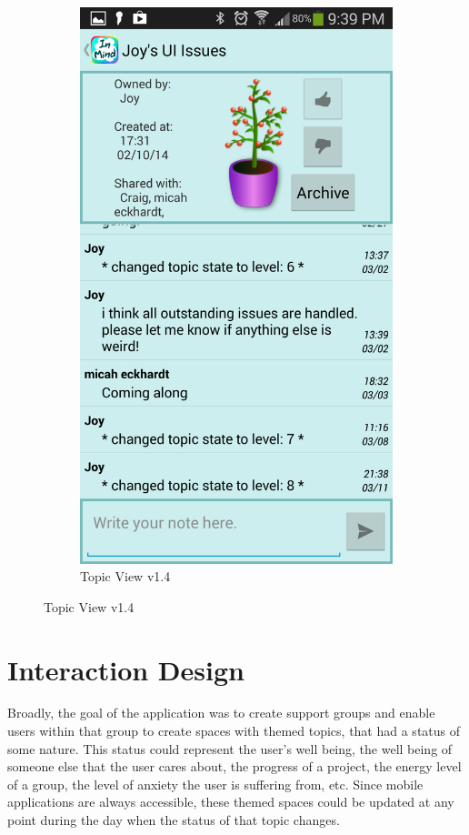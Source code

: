 \begin{figure}
\begin{subfigure}[b]{0.4\textwidth}
      \includegraphics[width=\textwidth]{plant_final.png}
       \caption{Topic View v1.4}
    \end{subfigure}
    \label{fig:topic_screens}
  \end{figure}

  \section{Interaction Design}
  Broadly, the goal of the application was to create support groups and 
  enable users within that group to create spaces
  with themed topics, that had a status of some nature.
  This status could represent the user's well being, the well being of someone else
  that the user cares about, the progress of a project, the energy level of a group,
  the level of anxiety the user is suffering from, etc.
  Since mobile applications are always accessible,
  these themed spaces could be updated at any point
  during the day when the status of that topic changes.

